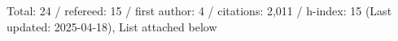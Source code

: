 Total: 24 / refereed: 15 / first author: 4 / citations: 2,011 / h-index: 15 (Last updated: 2025-04-18), List attached below